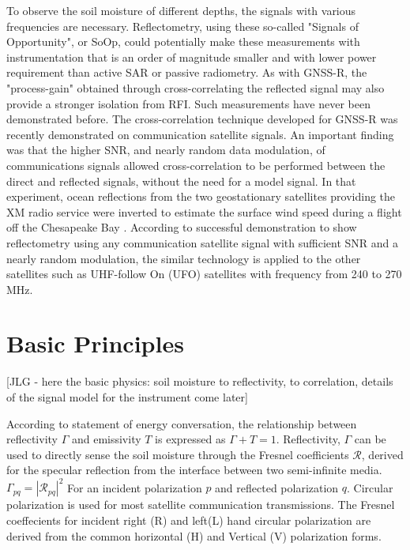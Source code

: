 \documentclass[draftcls,onecolumn]{IEEEtran}  %
\begin{document}
To observe the soil moisture of different depths, the signals with various frequencies are necessary. Reflectometry, using these so-called "Signals of Opportunity", or SoOp, could potentially make these measurements with instrumentation that is an order of magnitude smaller and with lower power requirement than active SAR or passive radiometry. As with GNSS-R, the "process-gain" obtained through cross-correlating the reflected signal may also provide a stronger isolation from RFI. Such measurements have never been demonstrated before. The cross-correlation technique developed for GNSS-R was recently demonstrated on communication satellite signals. An important finding was that the higher SNR, and nearly random data modulation, of communications signals allowed cross-correlation to be performed between the direct and reflected signals, without the need for a model signal. In that experiment, ocean reflections from the two geostationary satellites providing the XM radio service were inverted to estimate the surface wind speed during a flight off the Chesapeake Bay \cite{Shah:2011}. According to successful demonstration to show reflectometry using any communication satellite signal with sufficient SNR and a nearly random modulation, the similar technology is applied to the other satellites such as UHF-follow On (UFO) satellites with frequency from 240 to 270 MHz.





\section{Basic Principles}

[JLG - here the basic physics:  soil moisture to reflectivity, to correlation, details of the signal model for the instrument come later]

According to statement of energy conversation, the relationship between reflectivity $\Gamma$ and emissivity $T$ is expressed as $\Gamma + T = 1$. Reflectivity, $\Gamma$ can be used to directly sense the soil moisture through the   Fresnel  coefficients $\mathcal{R}$, derived for the specular reflection from the interface between two semi-infinite media.
$\Gamma_{pq} = |\mathcal{R}_{pq}|^2$ 
For an incident polarization $p$ and reflected polarization $q$. Circular polarization is used for most satellite communication transmissions.  The Fresnel coeffecients for incident right (R) and left(L) hand circular polarization are derived from the common horizontal (H) and Vertical (V) polarization forms. 
\end{document}
